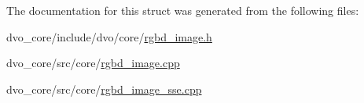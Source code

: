 The documentation for this struct was generated from the following files\+:\begin{DoxyCompactItemize}
\item 
dvo\+\_\+core/include/dvo/core/\mbox{\hyperlink{rgbd__image_8h}{rgbd\+\_\+image.\+h}}\item 
dvo\+\_\+core/src/core/\mbox{\hyperlink{rgbd__image_8cpp}{rgbd\+\_\+image.\+cpp}}\item 
dvo\+\_\+core/src/core/\mbox{\hyperlink{rgbd__image__sse_8cpp}{rgbd\+\_\+image\+\_\+sse.\+cpp}}\end{DoxyCompactItemize}
